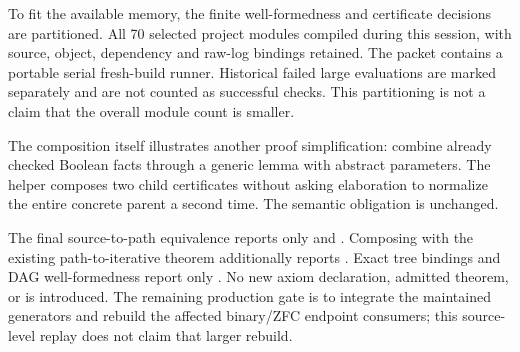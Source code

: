 To fit the available memory, the finite well-formedness and certificate decisions are partitioned. All 70 selected project modules compiled during this session, with source, object, dependency and raw-log bindings retained. The packet contains a portable serial fresh-build runner. Historical failed large evaluations are marked separately and are not counted as successful checks. This partitioning is not a claim that the overall module count is smaller.

The composition itself illustrates another proof simplification: combine already checked Boolean facts through a generic lemma with abstract parameters. The helper  composes two child certificates without asking elaboration to normalize the entire concrete parent a second time. The semantic obligation is unchanged.

The final source-to-path equivalence reports only  and . Composing with the existing path-to-iterative theorem additionally reports . Exact tree bindings and DAG well-formedness report only . No new axiom declaration, admitted theorem, or  is introduced. The remaining production gate is to integrate the maintained generators and rebuild the affected binary/ZFC endpoint consumers; this source-level replay does not claim that larger rebuild.
